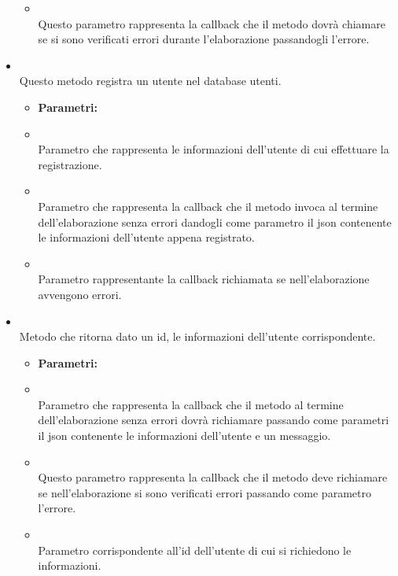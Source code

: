 \begin{itemize}
\begin{itemize}
\item[]  \\ Questo parametro rappresenta la callback che il metodo dovrà chiamare se si sono verificati errori durante l'elaborazione passandogli l'errore.
\end{itemize}
\item[] \textbf{} \\ Questo metodo registra un utente nel database utenti.
\begin{itemize}\addtolength{\itemsep}{-0.5\baselineskip}
\item[] \textbf{Parametri:}
\item[]  \\ Parametro che rappresenta le informazioni dell'utente di cui effettuare la registrazione.
\item[]  \\ Parametro che rappresenta la callback che il metodo invoca al termine dell'elaborazione senza errori dandogli come parametro il json contenente le informazioni dell'utente appena registrato.
\item[]  \\ Parametro rappresentante la callback richiamata se nell'elaborazione avvengono errori.
\end{itemize}
\item[] \textbf{} \\ Metodo che ritorna dato un id, le informazioni dell'utente corrispondente.
\begin{itemize}\addtolength{\itemsep}{-0.5\baselineskip}
\item[] \textbf{Parametri:}
\item[]  \\ Parametro che rappresenta la callback che il metodo al termine dell'elaborazione senza errori dovrà richiamare passando come parametri il json contenente le informazioni dell'utente e un messaggio.
\item[]  \\ Questo parametro rappresenta la callback che il metodo deve richiamare se nell'elaborazione si sono verificati errori passando come parametro l'errore.
\item[]  \\ Parametro corrispondente all'id dell'utente di cui si richiedono le informazioni. 

\end{itemize}
\end{itemize}
